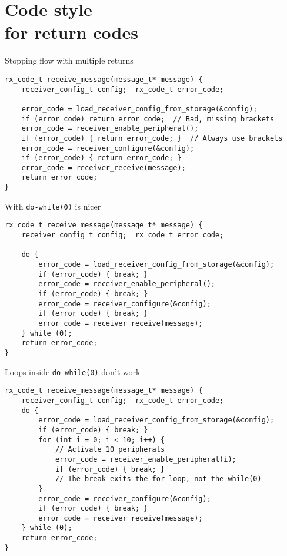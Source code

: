 \documentclass[aspectratio=169,14pt]{beamer}
\begin{document}
\section{Code style\\ for return codes}

\begin{frame}[fragile]{Stopping flow with multiple returns}
\begin{lstlisting}[style=cstyle]
rx_code_t receive_message(message_t* message) {
    receiver_config_t config;  rx_code_t error_code;
    
    error_code = load_receiver_config_from_storage(&config);
    if (error_code) return error_code;  // Bad, missing brackets
    error_code = receiver_enable_peripheral();
    if (error_code) { return error_code; }  // Always use brackets
    error_code = receiver_configure(&config);
    if (error_code) { return error_code; }
    error_code = receiver_receive(message);
    return error_code;
}
\end{lstlisting}
\end{frame}



\begin{frame}[fragile]{With \texttt{do-while(0)} is nicer}
\begin{lstlisting}[style=cstyle]
rx_code_t receive_message(message_t* message) {
    receiver_config_t config;  rx_code_t error_code;
    
    do {
        error_code = load_receiver_config_from_storage(&config);
        if (error_code) { break; }
        error_code = receiver_enable_peripheral();
        if (error_code) { break; }
        error_code = receiver_configure(&config);
        if (error_code) { break; }
        error_code = receiver_receive(message);
    } while (0);
    return error_code;
}
\end{lstlisting}
\end{frame}



\begin{frame}[fragile]{Loops inside \texttt{do-while(0)} don't work}
\begin{lstlisting}[style=cstyle]
rx_code_t receive_message(message_t* message) {
    receiver_config_t config;  rx_code_t error_code;
    do {
        error_code = load_receiver_config_from_storage(&config);
        if (error_code) { break; }
        for (int i = 0; i < 10; i++) {
            // Activate 10 peripherals
            error_code = receiver_enable_peripheral(i);
            if (error_code) { break; }
            // The break exits the for loop, not the while(0)
        }
        error_code = receiver_configure(&config);
        if (error_code) { break; }
        error_code = receiver_receive(message);
    } while (0);
    return error_code;
}
\end{lstlisting}
\end{frame}
\end{document}
